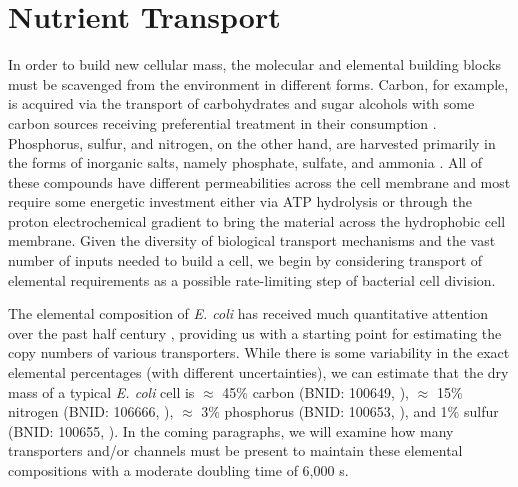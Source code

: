 \section{Nutrient Transport}
In order to build new cellular mass, the molecular and elemental building blocks
must be scavenged from the environment in different forms. Carbon, for example,
is acquired via the transport of carbohydrates and sugar alcohols with some
carbon sources receiving preferential treatment in their consumption
\citep{monod1947}. Phosphorus, sulfur, and nitrogen, on the other hand, are
harvested primarily in the forms of inorganic salts, namely phosphate, sulfate,
and ammonia \citep{jun2018, assentoft2016, stasi2019, antonenko1997,
rosenberg1977, willsky1973}. All of these compounds have different
permeabilities across the cell membrane and most require some energetic
investment either via ATP hydrolysis or through the proton electrochemical
gradient to bring the material across the hydrophobic cell membrane. Given the
diversity of biological transport mechanisms and the vast number of inputs
needed to build a cell, we begin by considering transport of elemental
requirements as a possible rate-limiting step of bacterial cell division.


The elemental composition of \textit{E. coli} has received much quantitative
attention over the past half century \citep{neidhardt1991, taymaz-nikerel2010,
heldal1985, bauer1976}, providing us with a starting point for estimating the
copy numbers of various transporters. While there is some variability in the
exact elemental percentages (with different uncertainties), we can estimate that
the dry mass of a typical \textit{E. coli} cell is $\approx$ 45\% carbon (BNID:
100649, \cite{milo2010}), $\approx$ 15\% nitrogen (BNID: 106666,
\cite{milo2010}), $\approx$ 3\% phosphorus (BNID: 100653, \cite{milo2010}), and
1\% sulfur (BNID: 100655, \cite{milo2010}). In the coming paragraphs, we will
examine how many transporters and/or channels must be present to maintain these
elemental compositions with a moderate doubling time of 6,000 s.

